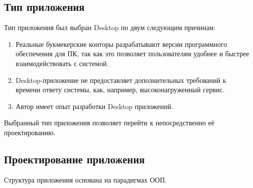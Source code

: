 \subsection{Тип приложения}
Тип приложения был выбран Desktop по двум следующим причинам:
\begin{enumerate}
	\item Реальные букмекерские конторы разрабатывают версии программного обеспечения для ПК, так как это позволяет пользователям удобнее и быстрее взаимодействовать с системой.
	\item Desktop-приложение не предоставляет дополнительных требований к времени ответу системы, как, например, высоконагруженный сервис. 
	\item Автор имеет опыт разработки Desktop приложений.
\end{enumerate}

Выбранный тип приложения позволяет перейти к непосредственно её проектированию.
\subsection{Проектирование приложения}
Структура приложения основана на парадигмах ООП. 

